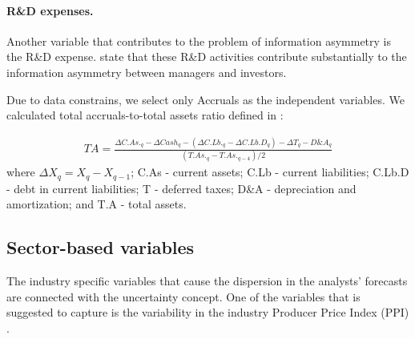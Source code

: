 \documentclass{article}\usepackage[]{graphicx}\usepackage[]{color}
\begin{document}
\paragraph{R\&D expenses.}
Another variable that contributes to the problem of information asymmetry is the R\&D expense. \cite{aboody2000} state that these R\&D activities contribute substantially to the information asymmetry between managers and investors. 

Due to data constrains, we select only Accruals as  the independent variables. We calculated total accruals-to-total assets ratio defined in \cite{creamer2009}:

\begin{eqnarray}
TA=\frac{\Delta C.As._q - \Delta Cash_q - (\Delta C.Lb._q - \Delta C.Lb.D_q) - \Delta T_q - D\& A_q}{(T.As._q - T.As._{q-4})/2}
\end{eqnarray}
where $\Delta X_q=X_q-X_{q-1}$; C.As - current assets; C.Lb - current liabilities; C.Lb.D - debt in current liabilities; T - deferred taxes; D\&A - depreciation and amortization; and T.A - total assets. 



\subsection{Sector-based variables}
The industry specific variables that cause the dispersion in the analysts' forecasts are connected  with the uncertainty concept. One of the variables that is suggested to capture is the variability in the industry Producer Price Index (PPI) \citep{henley2003}. 
\end{document}
